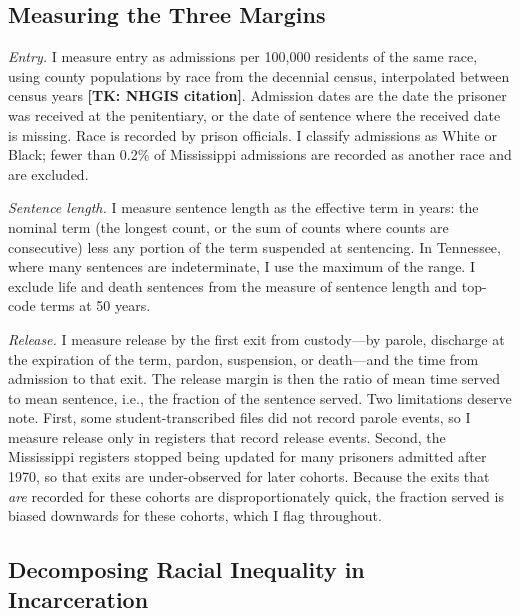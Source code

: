 \documentclass[12pt]{article}
\begin{document}
\subsection*{Measuring the Three Margins}

\noindent \emph{Entry.}  I measure entry as admissions per 100,000 residents of the same race, using county populations by race from the decennial census, interpolated between census years \textbf{[TK: NHGIS citation]}.  Admission dates are the date the prisoner was received at the penitentiary, or the date of sentence where the received date is missing.  Race is recorded by prison officials.  I classify admissions as White or Black; fewer than 0.2\% of Mississippi admissions are recorded as another race and are excluded.

\emph{Sentence length.}  I measure sentence length as the effective term in years: the nominal term (the longest count, or the sum of counts where counts are consecutive) less any portion of the term suspended at sentencing.  In Tennessee, where many sentences are indeterminate, I use the maximum of the range.  I exclude life and death sentences from the measure of sentence length and top-code terms at 50 years.

\emph{Release.}  I measure release by the first exit from custody---by parole, discharge at the expiration of the term, pardon, suspension, or death---and the time from admission to that exit.  The release margin is then the ratio of mean time served to mean sentence, i.e., the fraction of the sentence served.  Two limitations deserve note.  First, some student-transcribed files did not record parole events, so I measure release only in registers that record release events.  Second, the Mississippi registers stopped being updated for many prisoners admitted after 1970, so that exits are under-observed for later cohorts.  Because the exits that \emph{are} recorded for these cohorts are disproportionately quick, the fraction served is biased downwards for these cohorts, which I flag throughout.

\subsection*{Decomposing Racial Inequality in Incarceration}
\end{document}
